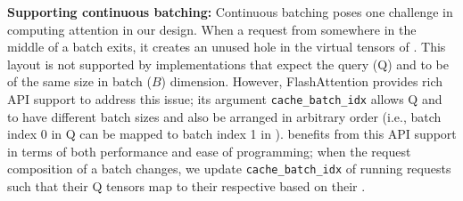 \noindent
\textbf{Supporting continuous batching:} Continuous batching poses one challenge in computing attention in our design. When a request from somewhere in the middle of a batch exits, it creates an unused hole in the virtual tensors of \kvcache. This layout is not supported by implementations that expect the query (Q) and \kvcache to be of the same size in batch ($B$) dimension. However, FlashAttention provides rich API support to address this issue; its argument \texttt{cache\_batch\_idx} allows Q and \kvcache to have different batch sizes and also be arranged in arbitrary order (i.e., batch index 0 in Q can be mapped to batch index 1 in \kvcache). \sysname benefits from this API support in terms of both performance and ease of programming; when the request composition of a batch changes, we update \texttt{cache\_batch\_idx} of running requests such that their Q tensors map to their respective \kvcache based on their \reqid.






